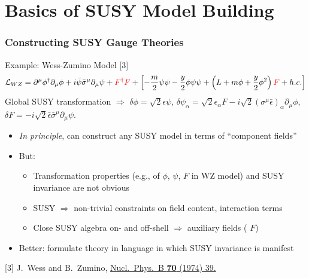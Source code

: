 \documentclass[10pt,aspectratio=169]{beamer}
\begin{document}
\section{Basics of SUSY Model Building}

\begin{frame}
  \frametitle{Constructing SUSY Gauge Theories}
  \begin{block}{Example: Wess-Zumino Model [3]}
    \begin{equation*}
      \mathcal{L}_{WZ} = \partial^\mu \phi^\dagger \partial_\mu \phi
      + i \bar{\psi} \bar{\sigma}^\mu \partial_\mu \psi + {\color{red}
        F^\dagger F} + \left [ -\frac{m}{2} \psi \psi - \frac{y}{2} \phi \psi
        \psi + \left ( L + m \phi + \frac{y}{2} \phi^2 \right ) {\color{red} F}
        + h.c. \right ]
    \end{equation*}
    Global SUSY transformation $\Rightarrow$
    $\delta \phi = \sqrt{2} \epsilon \psi$,
    $\delta \psi_\alpha = \sqrt{2} \epsilon_\alpha F - i \sqrt{2}
    ( \sigma^\mu \bar{\epsilon})_\alpha \partial_\mu \phi$,
    $\delta F = -i \sqrt{2} \bar{\epsilon} \bar{\sigma}^\mu \partial_\mu \psi$.
  \end{block}
  \begin{itemize}\itemsep1em
  \item \emph{In principle}, can construct any SUSY model in terms of
    ``component fields''
  \item But:
    \begin{itemize}\itemsep0.5em
    \item Transformation properties (e.g., of $\phi$, $\psi$, $F$ in WZ model)
      and SUSY invariance \alert{are not obvious}
    \item SUSY $\Rightarrow$ \alert{non-trivial constraints on field
      content, interaction terms}
    \item Close SUSY algebra on- and off-shell $\Rightarrow$ \alert{auxiliary
      fields} ({\color{red} $F$})
    \end{itemize}
  \item {\color{blue} Better: formulate theory in language in which
    SUSY invariance is manifest}
  \end{itemize}
  \vfill
      { \tiny [3] J.~Wess and B.~Zumino,
        \href{http://dx.doi.org/10.1016/0550-3213(74)90355-1}{%
          Nucl.~Phys.~B \textbf{70} (1974) 39.}}
\end{frame}
\end{document}
